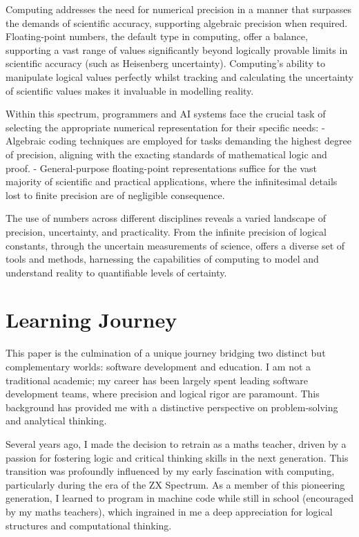 \documentclass[12pt]{article}
\begin{document}
Computing addresses the need for numerical precision in a manner that surpasses the demands of scientific accuracy, supporting algebraic precision when required. Floating-point numbers, the default type in computing, offer a balance, supporting a vast range of values significantly beyond logically provable limits in scientific accuracy (such as Heisenberg uncertainty). Computing's ability to manipulate logical values perfectly whilst tracking and calculating the uncertainty of scientific values makes it invaluable in modelling reality.

Within this spectrum, programmers and AI systems face the crucial task of selecting the appropriate numerical representation for their specific needs:
- Algebraic coding techniques are employed for tasks demanding the highest degree of precision, aligning with the exacting standards of mathematical logic and proof.
- General-purpose floating-point representations suffice for the vast majority of scientific and practical applications, where the infinitesimal details lost to finite precision are of negligible consequence.

The use of numbers across different disciplines reveals a varied landscape of precision, uncertainty, and practicality. From the infinite precision of logical constants, through the uncertain measurements of science, \iR{} offers a diverse set of tools and methods, harnessing the capabilities of computing to model and understand reality to quantifiable levels of certainty.

\section*{Learning Journey}
This paper is the culmination of a unique journey bridging two distinct but complementary worlds: software development and education. I am not a traditional academic; my career has been largely spent leading software development teams, where precision and logical rigor are paramount. This background has provided me with a distinctive perspective on problem-solving and analytical thinking.

Several years ago, I made the decision to retrain as a maths teacher, driven by a passion for fostering logic and critical thinking skills in the next generation. This transition was profoundly influenced by my early fascination with computing, particularly during the era of the ZX Spectrum. As a member of this pioneering generation, I learned to program in machine code while still in school (encouraged by my maths teachers), which ingrained in me a deep appreciation for logical structures and computational thinking.
\end{document}
